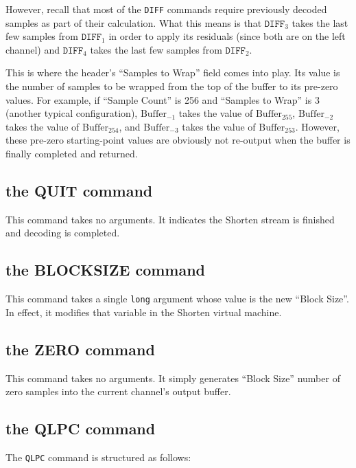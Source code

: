 However, recall that most of the \texttt{DIFF} commands require
previously decoded samples as part of their calculation.
What this means is that $\texttt{DIFF}_3$ takes the last
few samples from $\texttt{DIFF}_1$ in order to apply its residuals
(since both are on the left channel) and $\texttt{DIFF}_4$
takes the last few samples from $\texttt{DIFF}_2$.

This is where the header's ``Samples to Wrap'' field comes into play.
Its value is the number of samples to be wrapped from the top of the buffer
to its pre-zero values.
For example, if ``Sample Count'' is 256 and ``Samples to Wrap'' is 3
(another typical configuration),
$\text{Buffer}_{-1}$ takes the value of $\text{Buffer}_{255}$,
$\text{Buffer}_{-2}$ takes the value of $\text{Buffer}_{254}$, and
$\text{Buffer}_{-3}$ takes the value of $\text{Buffer}_{253}$.
However, these pre-zero starting-point values are obviously not
re-output when the buffer is finally completed and returned.

\subsection{the QUIT command}

This command takes no arguments.
It indicates the Shorten stream is finished and decoding is completed.

\subsection{the BLOCKSIZE command}

This command takes a single \texttt{long} argument
whose value is the new ``Block Size''.
In effect, it modifies that variable in the Shorten virtual machine.

\subsection{the ZERO command}

This command takes no arguments.
It simply generates ``Block Size'' number of zero samples
into the current channel's output buffer.

\pagebreak

\subsection{the QLPC command}

The \texttt{QLPC} command is structured as follows:

